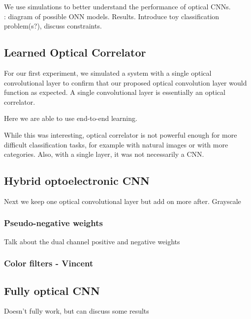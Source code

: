 We use simulations to better understand the performance of optical CNNs. \\
: diagram of possible ONN models.
 Results.
 Introduce toy classification problem(s?), discuss constraints.

\subsection{Learned Optical Correlator}
For our first experiment, we simulated a system with a single optical convolutional layer to confirm that our proposed optical convolution layer would function as expected. A single convolutional layer is essentially an optical correlator.  

Here we are able to use end-to-end learning. \\



While this was interesting, optical correlator is not powerful enough for more difficult classification tasks, for example with natural images or with more categories. Also, with a single layer, it was not necessarily a CNN.

\subsection{Hybrid optoelectronic CNN} 
Next we keep one optical convolutional layer but add on more after. 
	Grayscale \\

\subsubsection{Pseudo-negative weights}
	Talk about the dual channel positive and negative weights\\


\subsubsection{Color filters - Vincent}



\subsection{Fully optical CNN} 
Doesn’t fully work, but can discuss some results